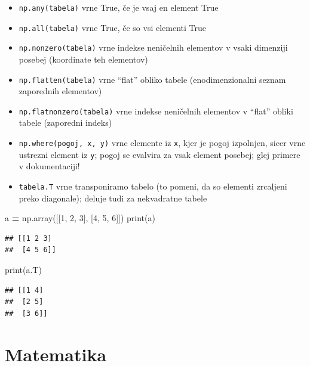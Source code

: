 \documentclass[
]{book}
\newenvironment{Shaded}{\begin{snugshade}}{\end{snugshade}}
\newcommand{\BuiltInTok}[1]{#1}
\newcommand{\DecValTok}[1]{\textcolor[rgb]{0.00,0.00,0.81}{#1}}
\newcommand{\NormalTok}[1]{#1}
\newcommand{\OperatorTok}[1]{\textcolor[rgb]{0.81,0.36,0.00}{\textbf{#1}}}
\providecommand{\tightlist}{%
  \setlength{\itemsep}{0pt}\setlength{\parskip}{0pt}}
\begin{document}
\begin{itemize}
\tightlist
\item
  \texttt{np.any(tabela)} vrne True, če je vsaj en element True
\item
  \texttt{np.all(tabela)} vrne True, če so vsi elementi True
\item
  \texttt{np.nonzero(tabela)} vrne indekse neničelnih elementov v vsaki dimenziji posebej (koordinate teh elementov)
\item
  \texttt{np.flatten(tabela)} vrne ``flat'' obliko tabele (enodimenzionalni seznam zaporednih elementov)
\item
  \texttt{np.flatnonzero(tabela)} vrne indekse neničelnih elementov v ``flat'' obliki tabele (zaporedni indeks)
\item
  \texttt{np.where(pogoj,\ x,\ y)} vrne elemente iz \texttt{x}, kjer je pogoj izpolnjen, sicer vrne ustrezni element iz \texttt{y}; pogoj se evalvira za vsak element posebej; glej primere v dokumentaciji!
\item
  \texttt{tabela.T} vrne transponiramo tabelo (to pomeni, da so elementi zrcaljeni preko diagonale); deluje tudi za nekvadratne tabele
\end{itemize}

\begin{Shaded}
\begin{Highlighting}[]
\NormalTok{a }\OperatorTok{=}\NormalTok{ np.array([[}\DecValTok{1}\NormalTok{, }\DecValTok{2}\NormalTok{, }\DecValTok{3}\NormalTok{], [}\DecValTok{4}\NormalTok{, }\DecValTok{5}\NormalTok{, }\DecValTok{6}\NormalTok{]])}
\BuiltInTok{print}\NormalTok{(a)}
\end{Highlighting}
\end{Shaded}

\begin{verbatim}
## [[1 2 3]
##  [4 5 6]]
\end{verbatim}

\begin{Shaded}
\begin{Highlighting}[]
\BuiltInTok{print}\NormalTok{(a.T)}
\end{Highlighting}
\end{Shaded}

\begin{verbatim}
## [[1 4]
##  [2 5]
##  [3 6]]
\end{verbatim}

\hypertarget{matematika}{%
\section{Matematika}\label{matematika}}
\end{document}
